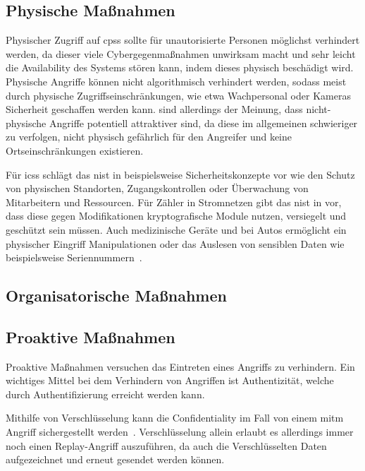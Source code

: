 \documentclass[final,bibliography=totocnumbered]{include/sikseminar}
\newcommand{\cps}{\glspl{cps}\xspace}
\begin{document}
\subsection{Physische Maßnahmen}\label{subsec:physisch}
Physischer Zugriff auf \cps sollte für unautorisierte Personen möglichst verhindert werden, da dieser viele Cybergegenmaßnahmen unwirksam macht und sehr leicht die Availability des Systems stören kann, indem dieses physisch beschädigt wird.
Physische Angriffe können nicht algorithmisch verhindert werden, sodass meist durch physische Zugriffseinschränkungen, wie etwa Wachpersonal oder Kameras Sicherheit geschaffen werden kann.
\citeauthor{CAS08} sind allerdings der Meinung, dass nicht-physische Angriffe potentiell attraktiver sind, da diese im allgemeinen schwieriger zu verfolgen, nicht physisch gefährlich für den Angreifer und keine Ortseinschränkungen existieren.

Für \glspl{ics} schlägt das \gls{nist} in \cite{HUM 153} beispielsweise Sicherheitskonzepte vor wie den Schutz von physischen Standorten, Zugangskontrollen oder Überwachung von Mitarbeitern und Ressourcen.
Für Zähler in Stromnetzen gibt das \gls{nist} in \cite{HUM 127} vor, dass diese gegen Modifikationen kryptografische Module nutzen, versiegelt und geschützt sein müssen.
Auch medizinische Geräte und bei Autos ermöglicht ein physischer Eingriff Manipulationen oder das Auslesen von sensiblen Daten wie beispielsweise Seriennummern~\cite{HLL+17}.


\subsection{Organisatorische Maßnahmen}\label{subsec:orga}

\subsection{Proaktive Maßnahmen}\label{subsec:proactive}
Proaktive Maßnahmen versuchen das Eintreten eines Angriffs zu verhindern.
Ein wichtiges Mittel bei dem Verhindern von Angriffen ist Authentizität, welche durch Authentifizierung erreicht werden kann.

Mithilfe von Verschlüsselung kann die Confidentiality im Fall von einem \gls{mitm} Angriff sichergestellt werden~\cite{HLL+17}.
Verschlüsselung allein erlaubt es allerdings immer noch einen Replay-Angriff auszuführen, da auch die Verschlüsselten Daten aufgezeichnet und erneut gesendet werden können.
\end{document}
